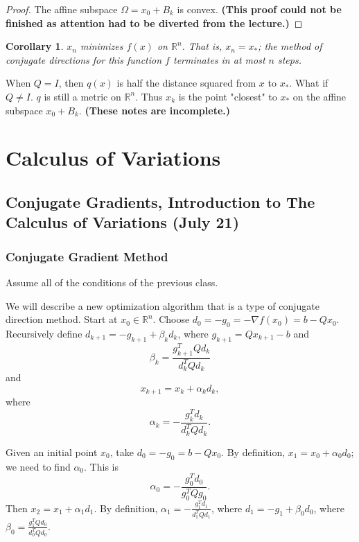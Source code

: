 \documentclass[11pt]{book}
\newcommand{\R}{\mathbb{R}}
\newtheorem{corollary}{Corollary}[subsection]
\begin{document}
\begin{proof}
The affine subspace $\Omega = x_0 + B_k$ is convex. \textbf{(This proof could not be finished as attention had to be diverted from the lecture.)}
\end{proof}

\begin{corollary}
$x_n$ minimizes $f(x)$ on $\R^n$. That is, $x_n = x_*$; the method of conjugate directions for this function $f$ terminates in at most $n$ steps. 
\end{corollary}

When $Q = I$, then $q(x)$ is half the distance squared from $x$ to $x_*$. What if $Q \neq I$. $q$ is still a metric on $\R^n$. Thus $x_k$ is the point "closest" to $x_*$ on the affine subspace $x_0 + B_k$. \textbf{(These notes are incomplete.)}

\newpage

\chapter{Calculus of Variations}

\section{Conjugate Gradients, Introduction to The Calculus of Variations (July 21)}

\subsection{Conjugate Gradient Method}

Assume all of the conditions of the previous class.

We will describe a new optimization algorithm that is a type of conjugate direction method. Start at $x_0 \in \R^n$. Choose $d_0 = -g_0 = -\nabla f(x_0) = b - Qx_0$. Recursively define $d_{k+1} = -g_{k+1} + \beta_k d_k$, where $g_{k+1} = Qx_{k+1} - b$ and
\[
\beta_k = \frac{g_{k+1}^T Q d_k}{d_k^TQd_k}
\]
and
\[
x_{k+1} = x_k + \alpha_k d_k,
\]
where
\[
\alpha_k = -\frac{g_k^T d_k}{d_k^T Q d_k}.
\]

Given an initial point $x_0$, take $d_0 = -g_0 = b - Qx_0$. By definition, $x_1 = x_0 + \alpha_0 d_0$; we need to find $\alpha_0$. This is
\[
\alpha_0 = -\frac{g_0^Td_0}{g_0^TQg_0}.
\]
Then $x_2 = x_1 + \alpha_1 d_1$. By definition, $\alpha_1 = -\frac{g_1^T d_1}{d_1^TQd_1}$, where $d_1 = -g_1 + \beta_0 d_0$, where $\beta_0 = \frac{g_1^TQd_0}{d_0^TQd_0}$.
\end{document}
